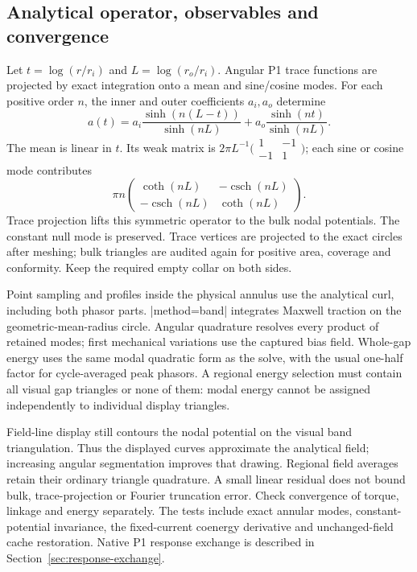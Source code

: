 \subsection{Analytical operator, observables and convergence}
Let $t=\log(r/r_i)$ and $L=\log(r_o/r_i)$. Angular P1 trace functions are
projected by exact integration onto a mean and sine/cosine modes. For each
positive order $n$, the inner and outer coefficients $a_i,a_o$ determine
\[
 a(t)=a_i\frac{\sinh(n(L-t))}{\sinh(nL)}
       +a_o\frac{\sinh(nt)}{\sinh(nL)}.
\]
The mean is linear in $t$. Its weak matrix is
$2\pi L^{-1}\bigl(\begin{smallmatrix}1&-1\\-1&1\end{smallmatrix}\bigr)$;
each sine or cosine mode contributes
\[
 \pi n\begin{pmatrix}\coth(nL)&-\operatorname{csch}(nL)\\
       -\operatorname{csch}(nL)&\coth(nL)\end{pmatrix}.
\]
Trace projection lifts this symmetric operator to the bulk nodal potentials.
The constant null mode is preserved. Trace vertices are projected to the exact
circles after meshing; bulk triangles are audited again for positive area,
coverage and conformity. Keep the required empty collar on both sides.

Point sampling and profiles inside the physical annulus use the analytical
curl, including both phasor parts. |method=band| integrates Maxwell traction
on the geometric-mean-radius circle. Angular quadrature resolves every product
of retained modes; first mechanical variations use the captured bias field.
Whole-gap energy uses the same modal quadratic form as the solve, with the
usual one-half factor for cycle-averaged peak phasors. A regional energy
selection must contain all visual gap triangles or none of them: modal energy
cannot be assigned independently to individual display triangles.

Field-line display still contours the nodal potential on the visual band
triangulation. Thus the displayed curves approximate the analytical field;
increasing angular segmentation improves that drawing. Regional field averages
retain their ordinary triangle quadrature. A small linear residual does not
bound bulk, trace-projection or Fourier truncation error. Check convergence of
torque, linkage and energy separately. The tests include exact annular modes,
constant-potential invariance, the fixed-current coenergy derivative and
unchanged-field cache restoration. Native P1 response exchange is described
in Section~\ref{sec:response-exchange}.
